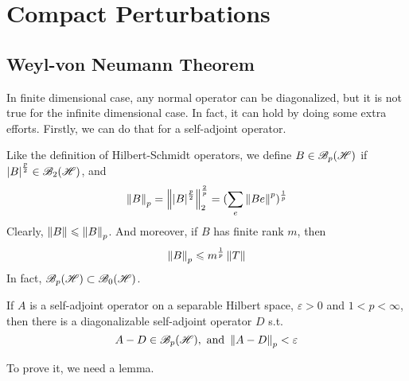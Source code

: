 \documentclass[a4paper,11pt]{report}
\begin{document}
\section{Compact Perturbations}

\subsection{Weyl-von Neumann Theorem}

In finite dimensional case, any normal operator can be diagonalized, but it is not true for the infinite dimensional case. In fact, it can hold by doing some extra efforts. Firstly, we can do that for a self-adjoint operator. 

Like the definition of Hilbert-Schmidt operators, we define $B \in \mathscr{B}_p(\mathscr{H})$ if $\left\lvert B\right\lvert^{\frac{p}{2}} \in \mathscr{B}_{2}\mathscr{(H)}$, and 
\begin{equation*}
	\left\lVert B\right\lVert_p = \left\lVert\left\lvert B\right\lvert^{\frac{p}{2}}\right\lVert_2^{\frac{2}{p}} = (\sum_e \left\lVert Be\right\lVert^p)^{\frac{1}{p}}
\end{equation*}
Clearly, $\left\lVert B\right\lVert \leqslant \left\lVert B\right\lVert_p$. And moreover, if $B$ has finite rank $m$, then
\begin{equation*}
	\left\lVert B\right\lVert_p \leqslant m^{\frac{1}{p}} \left\lVert T\right\lVert
\end{equation*}
In fact, $\mathscr{B}_p(\mathscr{H}) \subset \mathscr{B}_{0}\mathscr{(H)}$.

\begin{thm}
	If $A$ is a self-adjoint operator on a separable Hilbert space, $\varepsilon > 0$ and $1 < p < \infty$, then there is a diagonalizable self-adjoint operator $D$ s.t. 
	\begin{equation*}
		A-D \in \mathscr{B}_p(\mathscr{H}), \text{ and } \left\lVert A-D\right\lVert_p < \varepsilon
	\end{equation*}
\end{thm}

To prove it, we need a lemma.
\end{document}

